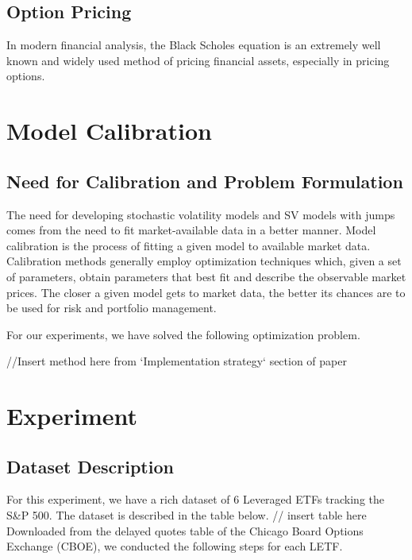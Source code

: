 \documentclass{article}
\begin{document}
\subsection{Option Pricing}
In modern financial analysis, the Black Scholes equation is an extremely well known and widely used method of pricing financial assets, especially in pricing options. 
\section{Model Calibration}
\subsection{Need for Calibration and Problem Formulation}
The need for developing stochastic volatility models and SV models with jumps comes from the need to fit market-available data in a better manner. Model calibration is the process of fitting a given model to available market data. Calibration methods generally employ optimization techniques which, given a set of parameters, obtain parameters that best fit and describe the observable market prices. The closer a given model gets to market data, the better its chances are to be used for risk and portfolio management. 

For our experiments, we have solved the following optimization problem. 
\begin{equation}
    
\end{equation}

//Insert method here from `Implementation strategy` section of paper
\section{Experiment}
\subsection{Dataset Description}
For this experiment, we have a rich dataset of 6 Leveraged ETFs tracking the S&P 500. The dataset is described in the table below. 
\newline\newline
 // insert table here
\newline\newline
Downloaded from the delayed quotes table of the Chicago Board Options Exchange (CBOE), we conducted the following steps for each LETF. 
\end{document}
